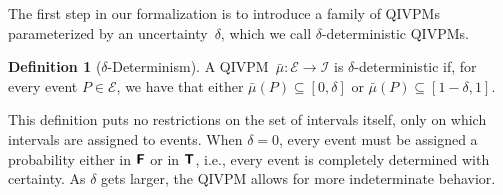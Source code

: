 \documentclass[english,reprint, aps, prl,superscriptaddress, showpacs,
showkeys, longbibliography, amsmath, amssymb, floatfix]{revtex4-1}
\theoremstyle{plain}
\theoremstyle{definition}
\newtheorem{definition}{Definition}
\newcommand{\events}{\ensuremath{\mathcal{E}}}
\newcommand{\interval}[1]{{\normalfont\textsf{\textbf{#1}}}}
\newcommand{\imposs}{\interval{F}}
\newcommand{\necess}{\interval{T}}
\newcommand{\unknown}{\interval{U}}
\newcommand{\proj}[1]{\op{#1}{#1}}
\newcommand{\says}[3]{\begin{framed}\begin{minipage}{0.9\linewidth}\color{#1}{#2 says: #3}\end{minipage}\end{framed}}
\newcommand{\yutsung}[1]{\says{purple}{Yu-Tsung}{#1}}
\begin{document}
The first step in our formalization is to introduce a family of QIVPMs
parameterized by an uncertainty~$\delta$, which we call
$\delta$-deterministic QIVPMs.

\begin{definition}[$\delta$-Determinism]\label{def:delta-deterministic} A
  QIVPM~$\bar{\mu}:\events\rightarrow\mathscr{I}$ is
  $\delta$-deterministic if, for every event $P\in\events$, we have
  that either 
  $\bar{\mu}\left(P\right)\subseteq\left[0,\delta\right]$ or
  $\bar{\mu}\left(P\right)\subseteq\left[1-\delta,1\right]$. 
\end{definition}


\noindent This definition puts no restrictions on the set of intervals
itself, only on which intervals are assigned to events. When
$\delta=0$, every event must be assigned a probability either in
$\imposs$ or in $\necess$, i.e., every event is completely determined
with certainty. As $\delta$ gets larger, the QIVPM allows for more
indeterminate behavior. %
\end{document}
